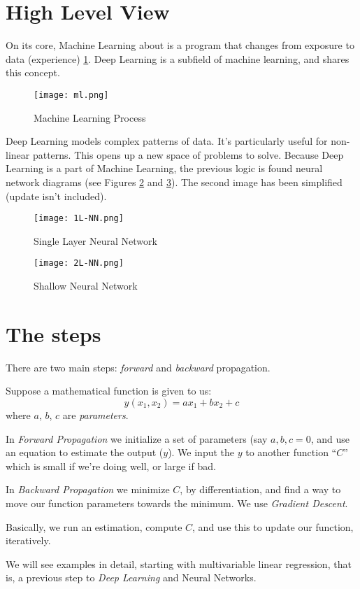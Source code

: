 \section{High Level View}

On its core, Machine Learning about is a program that changes from exposure to data (experience) \ref{fig:learn}. Deep Learning is a subfield of machine learning, and shares this concept.

\begin{figure}[h]
 \centering
 \texttt{[image: ml.png]}
  \caption{Machine Learning Process}\label{fig:learn}
\end{figure}

Deep Learning models complex patterns of data. It's particularly useful for non-linear patterns. This opens up a new space of problems to solve. Because Deep Learning is a part of Machine Learning, the previous logic is found neural network diagrams (see Figures \ref{fig:single} and \ref{fig:shallow}). The second image has been simplified (update isn't included).


\begin{figure}
 \centering
 \texttt{[image: 1L-NN.png]}
 \caption{Single Layer Neural Network}
 \label{fig:single}
\end{figure}


\begin{figure}
 \centering
 \texttt{[image: 2L-NN.png]}
 \caption{Shallow Neural Network}
 \label{fig:shallow}
\end{figure}

\section{The steps}
There are two main steps: \textit{forward} and \textit{backward} propagation. 

Suppose a mathematical function is given to us:
$$ y(x_1,x_2) = a x_1 + b x_2 + c$$
where $a$, $b$, $c$ are \textit{parameters}.

In \textit{Forward Propagation} we initialize a set of parameters (say $a,b,c=0$, and use an equation to estimate the output ($y$). We input the $y$ to another function ``$C$'' which is small if we're doing well, or large if bad.

In \textit{Backward Propagation} we minimize $C$, by differentiation, and find a way to move our function parameters towards the minimum. We use \textit{Gradient Descent}.

Basically, we run an estimation, compute $C$, and use this to update our function, iteratively.

We will see examples in detail, starting with multivariable linear regression, that is, a previous step to \textit{Deep Learning} and Neural Networks.
